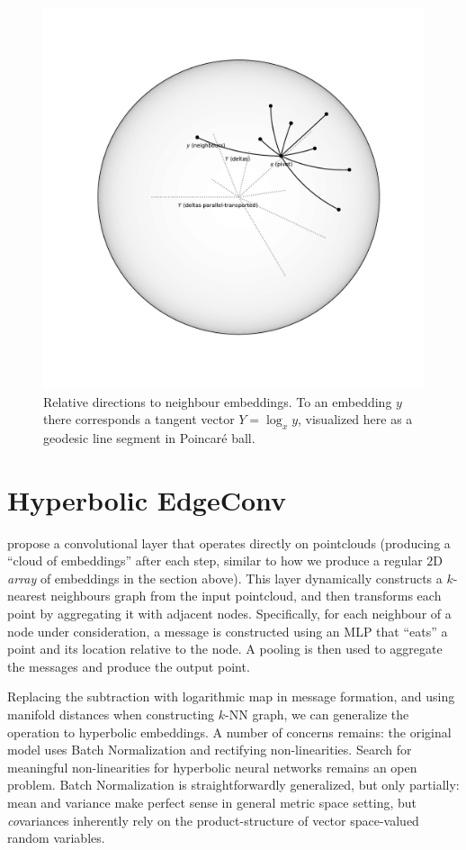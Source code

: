 \begin{figure}[ht]\center
\includegraphics[width=.9\textwidth]{art/neighbours.pdf}
\caption{Relative directions to neighbour embeddings. To an embedding \( y \)
there corresponds a tangent vector \( Y = \log_x y \), visualized here as a
geodesic line segment in Poincar\'e ball.}
\end{figure}

\section{Hyperbolic EdgeConv} \label{sec:hedgeconv}

\citet{edgeconv} propose a convolutional layer that operates directly on
pointclouds (producing a ``cloud of embeddings'' after each step, similar to
how we produce a regular \( 2 \)D \emph{array} of embeddings in the section
above). This layer dynamically constructs a \( k \)-nearest neighbours graph
from the input pointcloud, and then transforms each point by aggregating it
with adjacent nodes. Specifically, for each neighbour of a node under
consideration, a message is constructed using an MLP that ``eats'' a point and its
location relative to the node. A pooling is then used to aggregate the messages
and produce the output point.

Replacing the subtraction with logarithmic map in message formation, and using
manifold distances when constructing \( k \)-NN graph, we can generalize the
operation to hyperbolic embeddings. A number of concerns remains: the original
model uses Batch Normalization and rectifying non-linearities. Search for
meaningful non-linearities for hyperbolic neural networks remains an open
problem. Batch Normalization is straightforwardly generalized, but only
partially: mean and variance make perfect sense in general metric space
setting, but \emph{co}variances inherently rely on the product-structure of
vector space-valued random variables.


